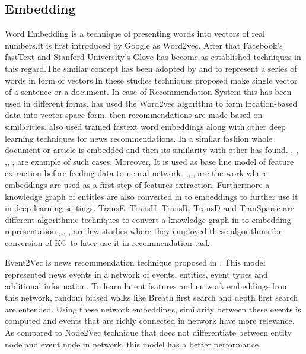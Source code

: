 \subsection{Embedding}
Word Embedding is a technique of presenting words into vectors of real numbers,it is first introduced by Google as Word2vec\cite{w2v}. After that Facebook's fastText\cite{fasttext} and Stanford University's Glove\cite{glove} has become as established techniques in this regard.The similar concept has been adopted by \cite{doc2vec} and \cite{sent2vec} to represent a series of words in form of vectors.In these studies techniques proposed make single vector of a sentence or a document.
\newline In case of Recommendation System this has been used in different forms.\cite{N71} has used the Word2vec algorithm to form location-based data into vector space form, then recommendations are made based on similarities.\cite{N10} also used trained fastext word embeddings along with other deep learning techniques for news recommendations. In a similar fashion whole document or article is embedded and then its similarity with other has found. \cite{N1},\cite{N2} , \cite{N12},\cite{N35}, \cite{N44},\cite{N46} are example of such cases.
Moreover, It is used as base line model of feature extraction before feeding data to neural network.
\cite{N33},\cite{N11},\cite{N23},\cite{N36},\cite{N37} are the work where embeddings are used as a first step of features extraction.
Furthermore a knowledge graph of entitles are also converted in to embeddings to further use it in deep-learning settings. TransE\cite{TransE}, TransH\cite{TransH}, TransR\cite{TransR}, TransD\cite{TransD} and TranSparse\cite{TranSparse} are different algorithmic techniques to convert a knowledge graph in to embedding representation.\cite{N3},\cite{N14},\cite{N16}. \cite{N20}, \cite{N40} are few studies where they employed these algorithms for conversion of KG to later use it in recommendation task. 

Event2Vec is news recommendation technique
proposed in \cite{N20}. This model represented news events in a network of events, entities, event types and additional information. To learn latent features and network embeddings from this network, random biased walks like Breath first search and depth first search are entended. Using these network embeddings, similarity between these events is computed and events that are richly connected in network have more relevance. As compared to Node2Vec technique that does not differentiate between entity node and event node in network, this model has a better performance.




